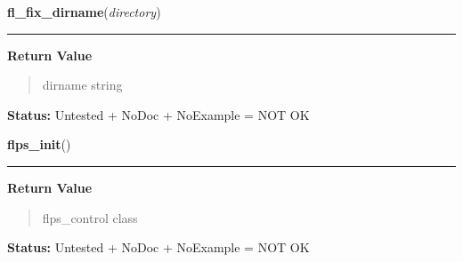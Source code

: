     \vspace{0.5ex}

\hspace{.8\funcindent}\begin{boxedminipage}{\funcwidth}

    \raggedright \textbf{fl\_fix\_dirname}(\textit{directory})

    \vspace{-1.5ex}

    \rule{\textwidth}{0.5\fboxrule}
\setlength{\parskip}{2ex}
\setlength{\parskip}{1ex}
      \textbf{Return Value}
    \vspace{-1ex}

      \begin{quote}
      dirname string

      \end{quote}

\textbf{Status:} Untested + NoDoc + NoExample = NOT OK



    \end{boxedminipage}

    \label{xformslib:library:flps_init}

    \vspace{0.5ex}

\hspace{.8\funcindent}\begin{boxedminipage}{\funcwidth}

    \raggedright \textbf{flps\_init}()

    \vspace{-1.5ex}

    \rule{\textwidth}{0.5\fboxrule}
\setlength{\parskip}{2ex}
\setlength{\parskip}{1ex}
      \textbf{Return Value}
    \vspace{-1ex}

      \begin{quote}
      flps\_control class

      \end{quote}

\textbf{Status:} Untested + NoDoc + NoExample = NOT OK



    \end{boxedminipage}

    \label{xformslib:library:fl_object_ps_dump}


